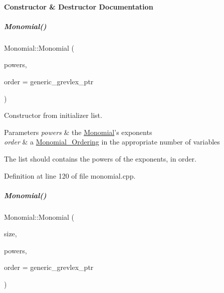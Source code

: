 \paragraph{Constructor \& Destructor Documentation}
\mbox{\label{group__polygroup_a8b9c7bc9d5b286adb11ccc39471b00c4}} 
\subparagraph{\texorpdfstring{Monomial()}{Monomial()}\hspace{0.1cm}{\footnotesize\ttfamily [1/2]}}
{\footnotesize\ttfamily Monomial\+::\+Monomial (\begin{DoxyParamCaption}\item[{initializer\+\_\+list$<$ E\+X\+P\+\_\+\+T\+Y\+PE $>$}]{powers,  }\item[{const \hyperlink{group__orderinggroup_class_monomial___ordering}{Monomial\+\_\+\+Ordering} $\ast$}]{order = {\ttfamily generic\+\_\+grevlex\+\_\+ptr} }\end{DoxyParamCaption})}



Constructor from initializer list. 


\begin{DoxyParams}{Parameters}
{\em powers} & the \hyperlink{group__polygroup_class_monomial}{Monomial}'s exponents \\
\hline
{\em order} & a \hyperlink{group__orderinggroup_class_monomial___ordering}{Monomial\+\_\+\+Ordering} in the appropriate number of variables\\
\hline
\end{DoxyParams}
The list should contains the powers of the exponents, in order. 

Definition at line 120 of file monomial.\+cpp.

\mbox{\label{group__polygroup_a85d91b1a13592c849394c26c5ad294d8}} 
\subparagraph{\texorpdfstring{Monomial()}{Monomial()}\hspace{0.1cm}{\footnotesize\ttfamily [2/2]}}
{\footnotesize\ttfamily Monomial\+::\+Monomial (\begin{DoxyParamCaption}\item[{N\+V\+A\+R\+\_\+\+T\+Y\+PE}]{size,  }\item[{const E\+X\+P\+\_\+\+T\+Y\+PE $\ast$}]{powers,  }\item[{const \hyperlink{group__orderinggroup_class_monomial___ordering}{Monomial\+\_\+\+Ordering} $\ast$}]{order = {\ttfamily generic\+\_\+grevlex\+\_\+ptr} }\end{DoxyParamCaption})}



